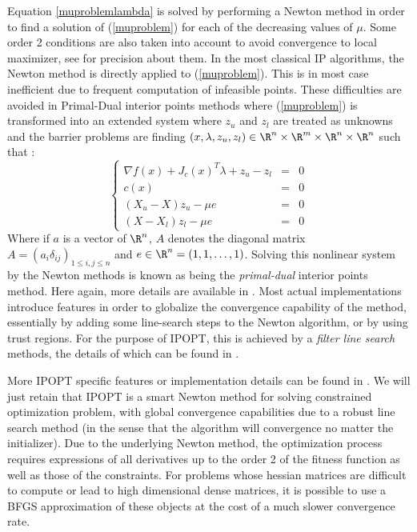 \documentclass[a4paper,twoside,12pt]{book}
\begin{document}
Equation \ref{muproblemlambda} is solved by performing a Newton method  in order to find a solution of (\ref{muproblem}) for each of the decreasing values of $\mu$. Some order 2 conditions are also taken into account to avoid convergence to local maximizer, see \cite{ipintro} for precision about them. In the most classical IP algorithms, the Newton method is directly applied to (\ref{muproblem}). This is in most case inefficient due to frequent computation of infeasible points. These difficulties are avoided in Primal-Dual interior points methods where (\ref{muproblem}) is transformed into an extended system where $z_u$ and $z_l$ are treated as unknowns and the barrier problems are finding $(x,\lambda,z_u,z_l)\in\R^n\times\R^m\times\R^n\times\R^n$ such that :
\begin{equation}\label{PrimalDualIPBarrierProblem}
\left\lbrace\begin{array}{rcl}
\nabla f(x) + J_{c}(x)^{T}\lambda+ z_{u} - z_{l} & = & 0 \\
c(x) & = & 0 \\
(X_u - X) z_u - \mu e & = & 0 \\
(X - X_l) z_l - \mu e & = & 0 
\end{array}\right.
\end{equation}
Where if $a$ is a vector of $\R^n$, $A$ denotes the diagonal matrix $A=(a_i \delta_{ij})_{1\leq i,j\leq n}$ and $e\in\R^{n} = (1,1,\dots,1)$. Solving this nonlinear system by the Newton methods is known as being
the \textit{primal-dual} interior points method. Here again, more details are available in \cite{ipintro}. Most actual implementations introduce features in order to globalize the convergence capability of the method, essentially by 
adding some line-search steps to the Newton algorithm, or by using trust regions. For the purpose of IPOPT, this is achieved by a \textit{filter line search} methods, the details of which can be found in \cite{iplinesearch}.

More IPOPT specific features or implementation details can be found in \cite{ipopt}. We will just retain that IPOPT is a smart Newton method for solving constrained optimization problem, with global convergence capabilities due to a robust line search method (in the sense that the algorithm will convergence no matter the initializer). Due to the underlying Newton method, the optimization process requires expressions of all derivatives up to the order 2 of the fitness function as well as those of the constraints. For problems whose hessian matrices are difficult to compute or lead to high dimensional dense matrices, it is possible to use a BFGS approximation of these objects at the cost of a much slower convergence rate.
\end{document}

